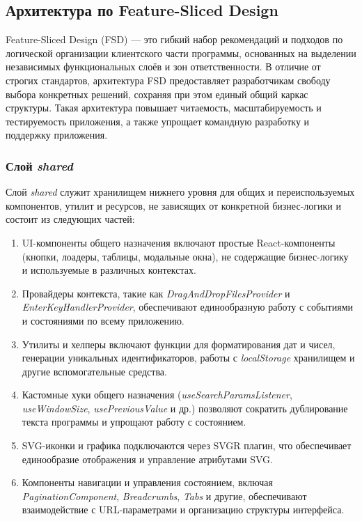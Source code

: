 \subsection{Архитектура по Feature-Sliced Design}

Feature-Sliced Design (FSD) — это гибкий набор рекомендаций и подходов по логической организации клиентского части программы, основанных на выделении независимых функциональных слоёв и зон ответственности. В отличие от строгих стандартов, архитектура FSD предоставляет разработчикам свободу выбора конкретных решений, сохраняя при этом единый общий каркас структуры. Такая архитектура повышает читаемость, масштабируемость и тестируемость приложения, а также упрощает командную разработку и поддержку приложения.

\subsubsection{Слой \textit{shared}}

Слой \textit{shared} служит хранилищем нижнего уровня для общих и переиспользуемых компонентов, утилит и ресурсов, не зависящих от конкретной бизнес-логики и состоит из следующих частей:

\begin{enumerate}
  \item UI-компоненты общего назначения включают простые React-компоненты (кнопки, лоадеры, таблицы, модальные окна), не содержащие бизнес-логику и используемые в различных контекстах.
  \item Провайдеры контекста, такие как \textit{DragAndDropFilesProvider} и \textit{EnterKeyHandlerProvider}, обеспечивают единообразную работу с событиями и состояниями по всему приложению.
  \item Утилиты и хелперы включают функции для форматирования дат и чисел, генерации уникальных идентификаторов, работы с \textit{localStorage} хранилищем и другие вспомогательные средства.
  \item Кастомные хуки общего назначения (\textit{useSearchParamsListener}, \textit{useWindowSize}, \textit{usePreviousValue} и др.) позволяют сократить дублирование текста программы и упрощают работу с состоянием.
  \item SVG-иконки и графика подключаются через SVGR плагин, что обеспечивает единообразие отображения и управление атрибутами SVG.
  \item Компоненты навигации и управления состоянием, включая \textit{PaginationComponent}, \textit{Breadcrumbs}, \textit{Tabs} и другие, обеспечивают взаимодействие с URL-параметрами и организацию структуры интерфейса.
\end{enumerate}
